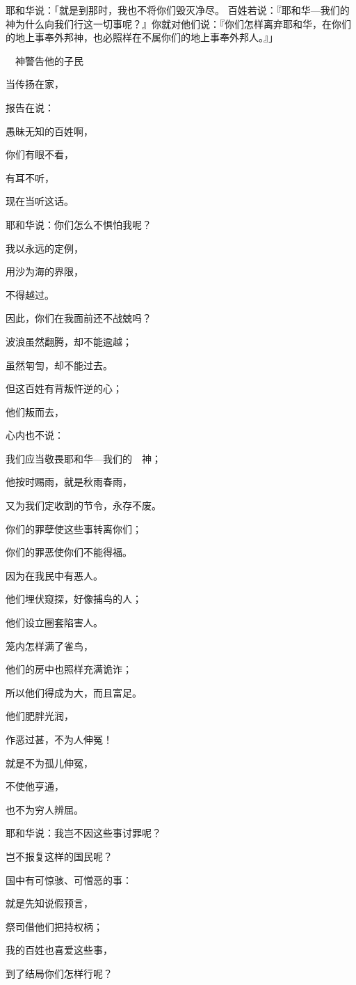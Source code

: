 {\par }{\PP {}耶和华说：「就是到那时，我也不将你们毁灭净尽。
百姓若说：『耶和华—我们的　神为什么向我们行这一切事呢？』你就对他们说：『你们怎样离弃耶和华，在你们的地上事奉外邦神，也必照样在不属你们的地上事奉外邦人。』」
\par }{\SH 　神警告他的子民
\par }{\Q {}当传扬在{}家，
\par }{\Q 报告在{}说：
\par }{\Q {}愚昧无知的百姓啊，
\par }{\Q 你们有眼不看，
\par }{\Q 有耳不听，
\par }{\Q 现在当听这话。
\par }{\Q {}耶和华说：你们怎么不惧怕我呢？
\par }{\Q 我以永远的定例，
\par }{\Q 用沙为海的界限，
\par }{不得越过。
\par }{\Q 因此，你们在我面前还不战兢吗？
\par }{\Q 波浪虽然翻腾，却不能逾越；
\par }{\Q 虽然匉訇，却不能过去。
\par }{\Q {}但这百姓有背叛忤逆的心；
\par }{\Q 他们叛{}而去，
\par }{\Q {}心内也不说：
\par }{\Q 我们应当敬畏耶和华—我们的　神；
\par }{\Q 他按时赐雨，就是秋雨春雨，
\par }{\Q 又为我们定收割的节令，永存不废。
\par }{\Q {}你们的罪孽使这些事转离你们；
\par }{\Q 你们的罪恶使你们不能得福。
\par }{\Q {}因为在我民中有恶人。
\par }{\Q 他们埋伏窥探，好像捕鸟的人；
\par }{\Q 他们设立圈套陷害人。
\par }{\Q {}笼内怎样满了雀鸟，
\par }{\Q 他们的房中也照样充满诡诈；
\par }{\Q 所以他们得成为大，而且富足。
\par }{\Q {}他们肥胖光润，
\par }{\Q 作恶过甚，不为人伸冤！
\par }{\Q 就是不为孤儿伸冤，
\par }{\Q 不使他亨通，
\par }{\Q 也不为穷人辨屈。
\par }{\Q {}耶和华说：我岂不因这些事讨罪呢？
\par }{\Q 岂不报复这样的国民呢？
\par }{\Q {}国中有可惊骇、可憎恶的事：
\par }{\Q {}就是先知说假预言，
\par }{\Q 祭司借他们把持权柄；
\par }{\Q 我的百姓也喜爱这些事，
\par }{\Q 到了结局你们怎样行呢？

}

